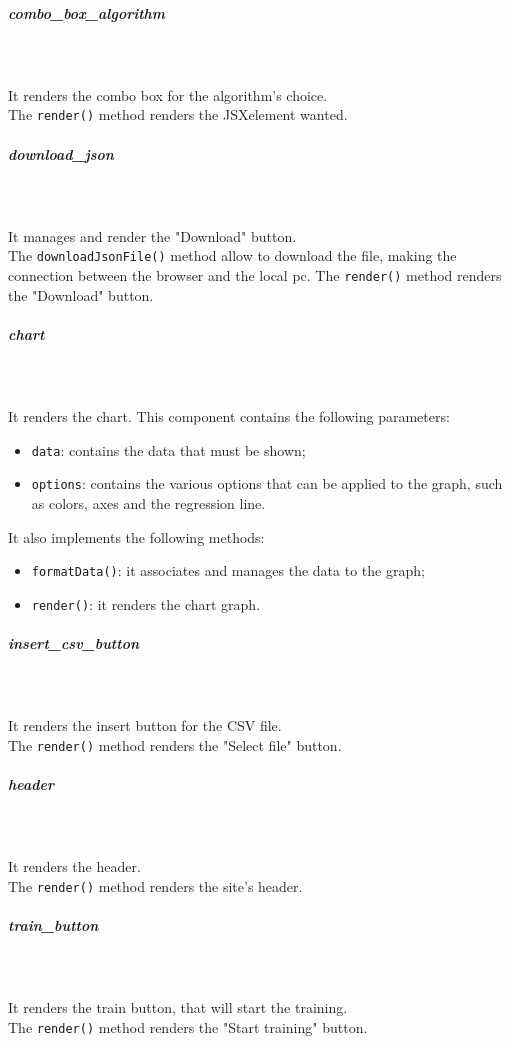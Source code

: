\subparagraph*{combo\_box\_algorithm}\mbox{} \\ \mbox{} \\
It renders the combo box for the algorithm's choice.\\
The \texttt{render()} method renders the JSX\glo element wanted.

\subparagraph*{download\_json}\mbox{} \\ \mbox{} \\
It manages and render the "Download" button.\\
The \texttt{downloadJsonFile()} method allow to download the file, making the connection between the browser and the local pc.
The \texttt{render()} method renders the "Download" button.

\subparagraph*{chart}\mbox{} \\ \mbox{} \\
It renders the chart.
This component contains the following parameters: 
\begin{itemize}
\item \texttt{data}: contains the data that must be shown;
\item \texttt{options}: contains the various options that can be applied to the graph, such as colors, axes and the regression line.
\end{itemize}
It also implements the following methods: 
\begin{itemize}
\item \texttt{formatData()}: it associates and manages the data to the graph;
\item \texttt{render()}: it renders the chart graph.

\end{itemize}

\subparagraph*{insert\_csv\_button}\mbox{} \\ \mbox{} \\
It renders the insert button for the CSV file.\\
The \texttt{render()} method renders the "Select file" button.

\subparagraph*{header}\mbox{} \\ \mbox{} \\
It renders the header.\\
The \texttt{render()} method renders the site's header.

\subparagraph*{train\_button}\mbox{} \\ \mbox{} \\
It renders the train button, that will start the training.\\
The \texttt{render()} method renders the "Start training" button.

